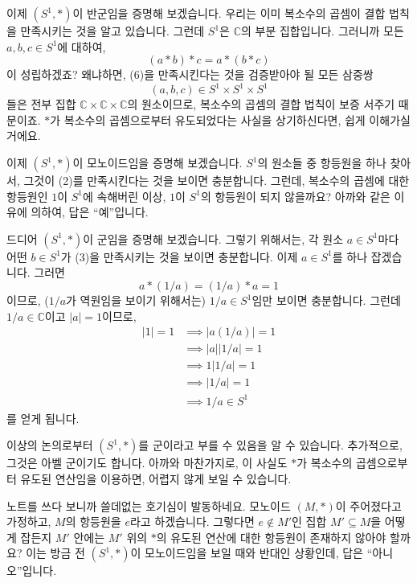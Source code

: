 \documentclass[12pt]{paper}
\begin{document}
  이제 $\left( S^1 , * \right)$이 반군임을 증명해 보겠습니다.
  우리는 이미 복소수의 곱셈이 결합 법칙을 만족시키는 것을 알고 있습니다.
  그런데 $S^1$은 $\mathbb{C}$의 부분 집합입니다.
  그러니까 모든 $a , b , c \in S^1$에 대하여, 
  \begin{equation*}
    (a * b) * c = a * (b * c) \tag{6}
  \end{equation*}
  이 성립하겠죠?
  왜냐하면, (6)을 만족시킨다는 것을 검증받아야 될 모든 삼중쌍 $$ \left( a , b , c \right) \in S^1 \times S^1 \times S^1 $$들은
  전부 집합 $\mathbb{C} \times \mathbb{C} \times \mathbb{C}$의 원소이므로,
  복소수의 곱셈의 결합 법칙이 보증 서주기 때문이죠.
  $*$가 복소수의 곱셈으로부터 유도되었다는 사실을 상기하신다면,
  쉽게 이해가실 거에요.

  이제 $\left( S^1 , * \right)$이 모노이드임을 증명해 보겠습니다.
  $S^1$의 원소들 중 항등원을 하나 찾아서, 그것이 (2)를 만족시킨다는 것을 보이면 충분합니다.
  그런데, 복소수의 곱셈에 대한 항등원인 $1$이 $S^1$에 속해버린 이상, $1$이 $S^1$의 항등원이 되지 않을까요?
  아까와 같은 이유에 의하여, 답은 ``예''입니다.

  드디어 $\left( S^1 , * \right)$이 군임을 증명해 보겠습니다.
  그렇기 위해서는, 각 원소 $a \in S^1$마다 어떤 $b \in S^1$가 (3)을 만족시키는 것을 보이면 충분합니다.
  이제 $a \in S^1$를 하나 잡겠습니다.
  그러면 $$ a * \left( 1 / a \right) = \left( 1 / a \right) * a = 1 $$이므로,
  ($1 / a$가 역원임을 보이기 위해서는) $1 / a \in S^1$임만 보이면 충분합니다.
  그런데 $1 / a \in \mathbb{C}$이고 $\left| a \right| = 1$이므로,
  \begin{align*}
    \left| 1 \right| = 1 
    & \implies \left| a \left( 1 / a \right) \right| = 1 \\
    & \implies \left| a \right| \left| 1 / a \right| = 1 \\
    & \implies 1 \left| 1 / a \right| = 1 \\
    & \implies \left| 1 / a \right| = 1 \\
    & \implies 1 / a \in S^1
  \end{align*}
  를 얻게 됩니다.

  이상의 논의로부터 $\left( S^1 , * \right)$를 군이라고 부를 수 있음을 알 수 있습니다.
  추가적으로, 그것은 아벨 군이기도 합니다.
  아까와 마찬가지로, 이 사실도 $*$가 복소수의 곱셈으로부터 유도된 연산임을 이용하면,
  어렵지 않게 보일 수 있습니다.

  노트를 쓰다 보니까 쓸데없는 호기심이 발동하네요.
  모노이드 $\left( M , * \right)$이 주어졌다고 가정하고, $M$의 항등원을 $e$라고 하겠습니다.
  그렇다면 $e \notin M'$인 집합 $M' \subseteq M$을 어떻게 잡든지 $M'$ 안에는 $M'$ 위의 $*$의 유도된 연산에 대한 항등원이 존재하지 않아야 할까요?
  이는 방금 전 $\left( S^1 , * \right)$이 모노이드임을 보일 때와 반대인 상황인데, 답은 ``아니오''입니다.
\end{document}
